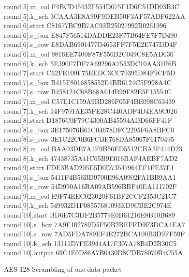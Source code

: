 \begin{tabbing}
  round[5].m\_col \> F4BCD45432E554D075F1D6C51DD03B3C \\
  round[5].k\_sch \> 3CAAA3E8A99F9DEB50F3AF57ADF622AA \\
  round[6].start \> C81677BC9B7AC93B25027992B0261996 \\
  round[6].s\_box \> E847F56514DADDE23F77B64FE7F7D490 \\
  round[6].s\_row \> E8DAB6901477D4653FF7F5E2E747DD4F \\
  round[6].m\_col \> 9816EE7400F87F556B2C049C8E5AD036 \\
  round[6].k\_sch \> 5E390F7DF7A69296A7553DC10AA31F6B \\
  round[7].start \> C62FE109F75EEDC3CC79395D84F9CF5D \\
  round[7].s\_box \> B415F8016858552E4BB6124C5F998A4C \\
  round[7].s\_row \> B458124C68B68A014B99F82E5F15554C \\
  round[7].m\_col \> C57E1C159A9BD286F05F4BE098C63439 \\
  round[7].k\_sch \> 14F9701AE35FE28C440ADF4D4EA9C026 \\
  round[8].start \> D1876C0F79C4300AB45594ADD66FF41F \\
  round[8].s\_box \> 3E175076B61C04678DFC2295F6A8BFC0 \\
  round[8].s\_row \> 3E1C22C0B6FCBF768DA85067F6170495 \\
  round[8].m\_col \> BAA03DE7A1F9B56ED5512CBA5F414D23 \\
  round[8].k\_sch \> 47438735A41C65B9E016BAF4AEBF7AD2 \\
  round[9].start \> FDE3BAD205E5D0D73547964EF1FE37F1 \\
  round[9].s\_box \> 5411F4B56BD9700E96A0902FA1BB9AA1 \\
  round[9].s\_row \> 54D990A16BA09AB596BBF40EA111702F \\
  round[9].m\_col \> E9F74EEC023020F61BF2CCF2353C21C7 \\
  round[9].k\_sch \> 549932D1F08557681093ED9CBE2C974E \\
  round[10].start \> BD6E7C3DF2B5779E0B61216E8B10B689 \\
  round[10].s\_box \> 7A9F102789D5F50B2BEFFD9F3DCA4EA7 \\
  round[10].s\_row \> 7AD5FDA789EF4E272BCA100B3D9FF59F \\
  round[10].k\_sch \> 13111D7FE3944A17F307A78B4D2B30C5 \\
  round[10].output \> 69C4E0D86A7B0430D8CDB78070B4C55A
  \caption{AES-128 Scrambling of one data packet}
  \label{tv:aes128_1}
\end{tabbing}

